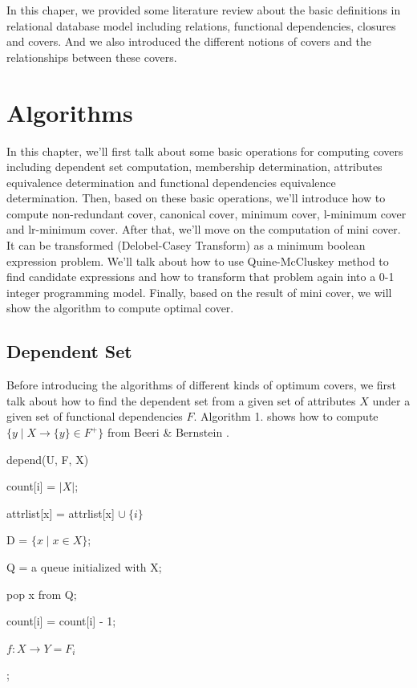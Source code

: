 \documentclass[11pt]{book}
\begin{document}
In this chaper, we provided some literature review about the basic definitions in relational database model including relations, functional dependencies, closures and covers. And we also introduced the different notions of covers and the relationships between these covers. 

\chapter{Algorithms}

In this chapter, we'll first talk about some basic operations for computing covers including dependent set computation, membership determination, attributes equivalence determination and functional dependencies equivalence determination. Then, based on these basic operations, we'll introduce how to compute non-redundant cover, canonical cover, minimum cover, l-minimum cover and lr-minimum cover. After that, we'll move on the computation of mini cover. It can be transformed (Delobel-Casey Transform) as a minimum boolean expression problem. We'll talk about how to use Quine-McCluskey method to find candidate expressions and how to transform that problem again into a 0-1 integer programming model. Finally, based on the result of mini cover, we will show the algorithm to compute optimal cover.

\section{Dependent Set}

Before introducing the algorithms of different kinds of optimum covers, we first talk about how to find the dependent set from a given set of attributes $X$ under a given set of functional dependencies $F$. Algorithm 1. shows how to compute $\{ y \mid X \rightarrow \{ y \} \in F^{+} \}$ from Beeri \& Bernstein \cite{beeri1979computational}.

\begin{algorithm}

  \caption{depend(U, F, X)}
 
  \SetAlgoLined
  
   {
    count[i] = $\lvert X \rvert$;
    
     {
    	attrlist[x] = attrlist[x] $\cup\ \{ i \}$
    }
  }
  
  D = $\{ x \mid x \in X \}$;
  
  Q = a queue initialized with X;
  
   {
  	pop x from Q;
  	
  	 {
  		count[i] = count[i] - 1;
  		
  		 {
  			$f: X \rightarrow Y = F_i$
  			
  		}
  	}
  }
  
  ;
\end{algorithm}
\end{document}
